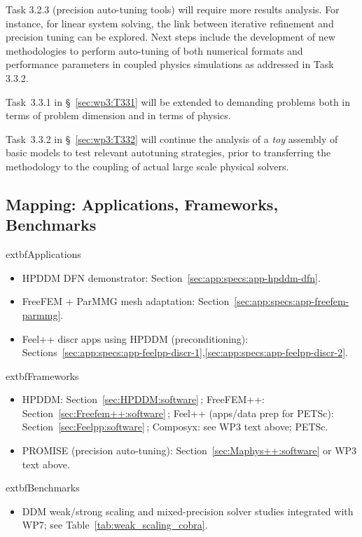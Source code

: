 Task 3.2.3 (precision auto-tuning tools) will require 
more results analysis. For instance, for linear system solving, the link between iterative refinement and precision tuning can be explored.
Next steps include the development of new methodologies to perform auto-tuning of both numerical formats and performance parameters in coupled physics simulations as addressed in Task 3.3.2.

Task~3.3.1 in \S~\ref{sec:wp3:T331} will be extended to demanding problems both in terms of problem dimension and in terms of physics. 

Task~3.3.2 in \S~\ref{sec:wp3:T332} will continue the analysis of a \textit{toy} assembly of basic models to test relevant autotuning strategies, prior to transferring the methodology to the coupling of actual large scale physical solvers.


\subsection{Mapping: Applications, Frameworks, Benchmarks}
\label{sec:wp3:mapping}
  	extbf{Applications}
\begin{itemize}
  \item HPDDM DFN demonstrator: Section~\ref{sec:app:specs:app-hpddm-dfn}.
  \item FreeFEM + ParMMG mesh adaptation: Section~\ref{sec:app:specs:app-freefem-parmmg}.
  \item Feel++ discr apps using HPDDM (preconditioning): Sections~\ref{sec:app:specs:app-feelpp-discr-1},\ref{sec:app:specs:app-feelpp-discr-2}.
\end{itemize}
  	extbf{Frameworks}
\begin{itemize}
  \item HPDDM: Section~\ref{sec:HPDDM:software}\,; FreeFEM++: Section~\ref{sec:Freefem++:software}\,; Feel++ (apps/data prep for PETSc): Section~\ref{sec:Feelpp:software}\,; Composyx: see WP3 text above; PETSc.
  \item PROMISE (precision auto-tuning): Section~\ref{sec:Maphys++:software} or WP3 text above.
\end{itemize}
  	extbf{Benchmarks}
\begin{itemize}
  \item DDM weak/strong scaling and mixed-precision solver studies integrated with WP7; see Table~\ref{tab:weak_scaling_cobra}.
\end{itemize}







